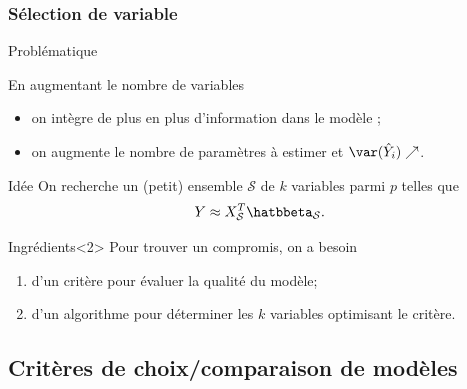 \documentclass{beamer}\usepackage[]{graphicx}\usepackage[]{color}
\begin{document}
\begin{frame}
  \frametitle{Sélection de variable}

  \begin{block}{Problématique}
    
  En augmentant le nombre de variables
  \begin{itemize}
  \item on intègre de plus en plus d'information dans le modèle ;
  \item on augmente le nombre de paramètres à estimer et $\var (\hat{Y}_i)\nearrow$.
  \end{itemize}  
\end{block}

  \vfill
  
  \begin{block}{Idée}
    On recherche  un (petit)  ensemble $\mathcal{S}$ de  $k$ variables
    parmi $p$ telles que
  \begin{equation*}
    Y \approx X_{\mathcal{S}}^T \hatbbeta_{\mathcal{S}}.
  \end{equation*} 
    \end{block}

  \vfill

  \begin{block}{Ingrédients}<2>
    Pour trouver un compromis, on a besoin
    \begin{enumerate}
    \item d'un \alert{critère} pour évaluer la qualité du modèle;
    \item d'un \alert{algorithme} pour déterminer les $k$ variables optimisant le critère.
    \end{enumerate}
  \end{block}

\end{frame}

\subsection{Critères de choix/comparaison de modèles}


\end{document}
